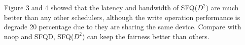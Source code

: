 Figure 3 and 4 showed that the latency and bandwidth of SFQ($D^2$) are much better than
any other schedulers, although the write operation performance is degrade 20 percentage
due to they are sharing the same device. Compare with noop and SFQD, SFQ($D^2$) can keep
the fairness better than others.\\
